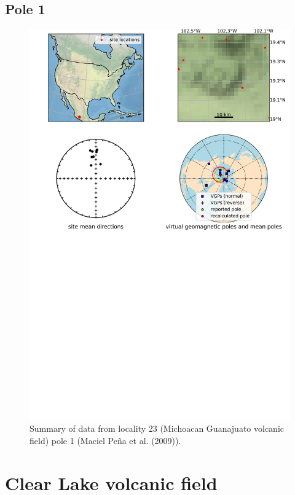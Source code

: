 \documentclass{article}
\begin{document}
\subsection{Pole 1}


\begin{figure}[H]
\centering
\includegraphics[width=5 in]{./23/1/pole_summary.png}
\caption{Summary of data from locality 23 (Michoacan Guanajuato volcanic field) pole 1 (Maciel Peña et al. (2009)).}
\end{figure}

\section{Clear Lake volcanic field}
\end{document}
